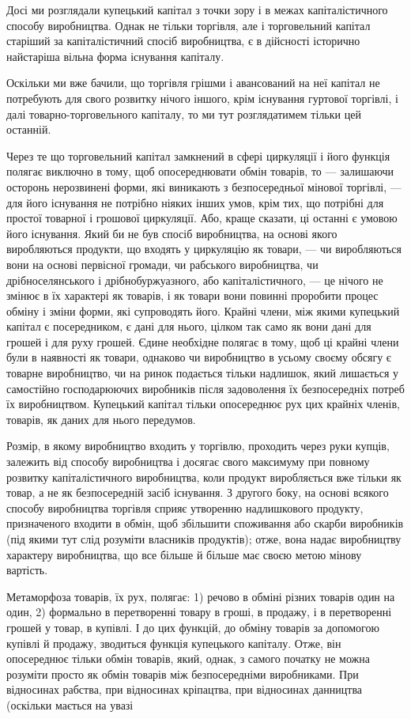 Досі ми розглядали купецький капітал з точки зору і в межах
капіталістичного способу виробництва. Однак не тільки торгівля,
але і торговельний капітал старіший за капіталістичний
спосіб виробництва, є в дійсності історично найстаріша
вільна форма існування капіталу.

Оскільки ми вже бачили, що торгівля грішми і авансований
на неї капітал не потребують для свого розвитку нічого іншого,
крім існування гуртової торгівлі, і далі товарно-торговельного
капіталу, то ми тут розглядатимем тільки цей останній.

Через те що торговельний капітал замкнений в сфері циркуляції
і його функція полягає виключно в тому, щоб опосереднювати
обмін товарів, то — залишаючи осторонь нерозвинені форми,
які виникають з безпосередньої мінової торгівлі, — для його існування
не потрібно ніяких інших умов, крім тих, що потрібні для
простої товарної і грошової циркуляції. Або, краще сказати, ці
останні є умовою його існування. Який би не був спосіб виробництва,
на основі якого виробляються продукти, що входять
у циркуляцію як товари, — чи виробляються вони на основі первісної
громади, чи рабського виробництва, чи дрібноселянського
і дрібнобуржуазного, або капіталістичного, — це нічого не змінює
в їх характері як товарів, і як товари вони повинні проробити
процес обміну і зміни форми, які супроводять його. Крайні
члени, між якими купецький капітал є посередником, є дані для
нього, цілком так само як вони дані для грошей і для руху грошей.
Єдине необхідне полягає в тому, щоб ці крайні члени були
в наявності як товари, однаково чи виробництво в усьому своєму
обсягу є товарне виробництво, чи на ринок подається тільки
надлишок, який лишається у самостійно господарюючих виробників
після задоволення їх безпосередніх потреб їх виробництвом.
Купецький капітал тільки опосереднює рух цих крайніх членів,
товарів, як даних для нього передумов.

Розмір, в якому виробництво входить у торгівлю, проходить
через руки купців, залежить від способу виробництва і досягає
свого максимуму при повному розвитку капіталістичного
виробництва, коли продукт виробляється вже тільки як товар,
а не як безпосередній засіб існування. З другого боку, на основі
всякого способу виробництва торгівля сприяє утворенню надлишкового
продукту, призначеного входити в обмін, щоб збільшити
споживання або скарби виробників (під якими тут слід
розуміти власників продуктів); отже, вона надає виробництву
характеру виробництва, що все більше й більше має своєю метою
мінову вартість.

Метаморфоза товарів, їх рух, полягає: 1) речово в обміні
різних товарів один на один, 2) формально в перетворенні товару
в гроші, в продажу, і в перетворенні грошей у товар,
в купівлі. І до цих функцій, до обміну товарів за допомогою
купівлі й продажу, зводиться функція купецького капіталу. Отже,
він опосереднює тільки обмін товарів, який, однак, з самого початку
не можна розуміти просто як обмін товарів між безпосередніми
виробниками. При відносинах рабства, при відносинах
кріпацтва, при відносинах данництва (оскільки мається на увазі
\parbreak{}  %
